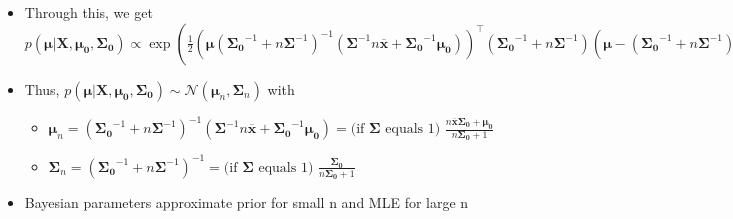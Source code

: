 \begin{itemize}
    \item Through this, we get $p(\boldsymbol{\mu} | \boldsymbol{X}, \boldsymbol{\mu_0}, \boldsymbol{\Sigma_0}) \propto \exp (  \frac{1}{2}  ( \boldsymbol{\mu} (  \boldsymbol{\Sigma_0}^{-1} + n \boldsymbol{\Sigma}^{-1} )^{-1} ( \boldsymbol{\Sigma}^{-1} n \overline{\boldsymbol{x}} + \boldsymbol{\Sigma_0}^{-1} \boldsymbol{\mu_0} ) )^\intercal ( \boldsymbol{\Sigma_0}^{-1} + n \boldsymbol{\Sigma}^{-1} ) ( \boldsymbol{\mu} - ( \boldsymbol{\Sigma_0}^{-1} + n \boldsymbol{\Sigma}^{-1} )^{-1} ( \boldsymbol{\Sigma}^{-1} n \overline{\boldsymbol{x}} + \boldsymbol{\Sigma_0}^{-1} \boldsymbol{\mu_0} ) ) ) = exp( \frac{1}{2} ( \boldsymbol{\mu} - \boldsymbol{\mu}_n )^\intercal  \boldsymbol{\Sigma}_n^{-1} ( \boldsymbol{\mu} - \boldsymbol{\mu}_n ) )$
    \item Thus, $p(\boldsymbol{\mu} | \boldsymbol{X}, \boldsymbol{\mu_0}, \boldsymbol{\Sigma_0}) \sim \mathcal{N}(\boldsymbol{\mu}_n, \boldsymbol{\Sigma}_n)$ with
    \begin{itemize}
        \item $\boldsymbol{\mu}_n = (\boldsymbol{\Sigma_0}^{-1} + n \boldsymbol{\Sigma}^{-1})^{-1} (\boldsymbol{\Sigma}^{-1} n \overline{\boldsymbol{x}} + \boldsymbol{\Sigma_0}^{-1} \boldsymbol{\mu_0}) = \textrm{(if } \boldsymbol{\Sigma} \textrm{ equals 1) } \frac{n \overline{\boldsymbol{x}} \boldsymbol{\Sigma_0} + \boldsymbol{\mu_0}}{n \boldsymbol{\Sigma_0} + 1}$
        \item $\boldsymbol{\Sigma}_n = (\boldsymbol{\Sigma_0}^{-1} + n \boldsymbol{\Sigma}^{-1})^{-1} = \textrm{(if } \boldsymbol{\Sigma} \textrm{ equals 1) } \frac{\boldsymbol{\Sigma_0}}{n \boldsymbol{\Sigma_0} + 1}$
    \end{itemize}
    \item Bayesian parameters approximate prior for small n and MLE for large n
\end{itemize}